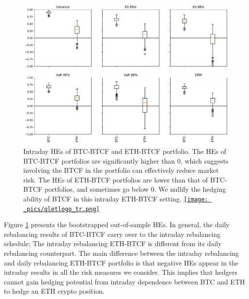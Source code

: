 \documentclass[11pt,a4paper,english]{article}
\providecommand{\natp}[1]{\textcolor{darkorange}{#1}}
\begin{document}
\begin{figure}[t]
\includegraphics[width=\textwidth]{_pics/intraday_HE.pdf}
  \caption{Intraday HEs of BTC-BTCF and ETH-BTCF portfolio. The HEs of BTC-BTCF portfolios are significantly higher than $0$,
which suggests involving the BTCF in the portfolio can effectively reduce market risk.
The HEs of ETH-BTCF portfolios are lower than that of BTC-BTCF portfolios, and sometimes go below $0$.
We nullify the hedging ability of BTCF in this intraday ETH-BTCF setting.
  \href{https://github.com/QuantLet/Hedging-Cryptos-with-Bitcoin-Futures/blob/main/newToQuantlet/Pynotebooks/figures/intraday/figure 13.ipynb}{\texttt{[image: \_pics/qletlogo\_tr.png]}} }
\label{fig:HEboxplot_intraday}
\end{figure}

Figure \ref{fig:HEboxplot_intraday} presents the bootstrapped out-of-sample HEs. 
In general, the daily rebalancing results of BTC-BTCF carry over to the intraday rebalancing schedule;
The intraday rebalancing ETH-BTCF is different from its daily rebalancing counterpart.
The main difference between the intraday rebalancing and daily
rebalancing ETH-BTCF portfolio is that negative HEs appear in the
intraday results in all the risk measures we consider. 
This implies that hedgers cannot gain hedging potential from intraday dependence between BTC and ETH to hedge an ETH crypto position. 
\end{document}
